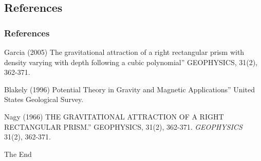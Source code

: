 \documentclass{beamer}
\begin{document}
\subsection{References}
\begin{frame}
\frametitle{References}
\footnotesize{
\begin{thebibliography}{99} %
 Garcia (2005)
\newblock  The gravitational attraction of a right rectangular prism with density varying with depth following a cubic polynomial” GEOPHYSICS, 31(2), 362-371.
\end{thebibliography}
\begin{thebibliography}{99} %
 Blakely (1996)
\newblock  Potential Theory in Gravity and Magnetic Applications” United States Geological Survey.
\end{thebibliography}
\begin{thebibliography}{99} %
 Nagy (1966)
\newblock  THE GRAVITATIONAL ATTRACTION OF A RIGHT RECTANGULAR PRISM.” GEOPHYSICS, 31(2), 362-371.
\newblock \emph{GEOPHYSICS} 31(2), 362-371.
\end{thebibliography}
}
\end{frame}


\begin{frame}
\Huge{\centerline{The End}}
\end{frame}

\end{document}
